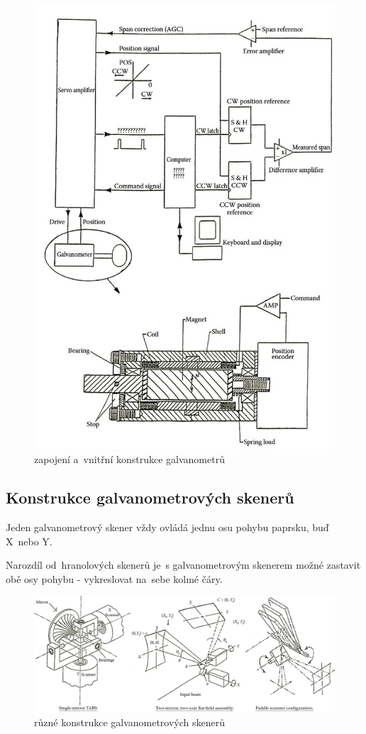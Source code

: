 \begin{figure}[!htb]
  \centering
  \includegraphics[width=1\textwidth]{img/galvanometer-detail.jpg}
  \caption{\label{fig:galvanometer-detail} zapojení a~vnitřní konstrukce galvanometrů}
\end{figure}

\subsection{Konstrukce galvanometrových skenerů\label{sec:galvo-scanner-construction}}
Jeden galvanometrový skener vždy ovládá jednu osu pohybu paprsku, buď X~nebo Y.

Narozdíl od~hranolových skenerů je~s galvanometrovým skenerem možné zastavit obě osy pohybu - vykreslovat na~sebe kolmé čáry.

\begin{figure}[!htb]
  \centering
  \includegraphics[width=1\textwidth]{img/scanner-constructions.jpg}
  \caption{\label{fig:scanner-constructions} různé konstrukce galvanometrových skenerů}
\end{figure}
